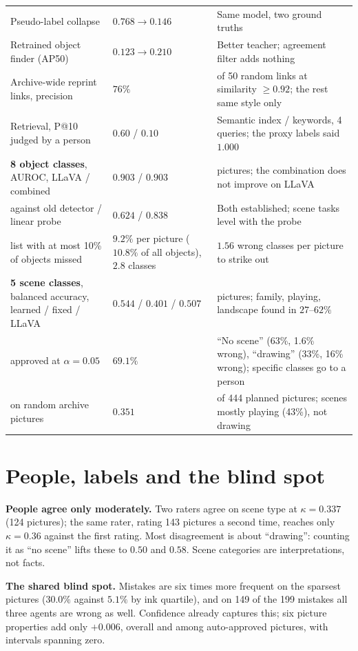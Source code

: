 \documentclass[10pt,a4paper]{article}
\begin{document}
\begin{center}
\begin{tabular}{>{\raggedright\arraybackslash}p{5.7cm} >{\raggedright\arraybackslash}p{3.4cm} >{\raggedright\arraybackslash}p{7.6cm}}
Pseudo-label collapse & $0.768\!\to\!0.146$ & Same model, two ground truths \\
Retrained object finder (AP50) & $0.123\!\to\!0.210$ & Better teacher; agreement filter adds nothing \\
Archive-wide reprint links, precision & $76\%$ & 38 of 50 random links at similarity $\geq 0.92$; the rest same style only \\
Retrieval, P@10 judged by a person & $0.60$ / $0.10$ & Semantic index / keywords, 4 queries; the proxy labels said $1.000$ \\
\textbf{8 object classes}, AUROC, LLaVA / combined & $0.903$ / $0.903$ & 300 pictures; the combination does not improve on LLaVA \\
\quad against old detector / linear probe & $0.624$ / $0.838$ & Both established; scene tasks level with the probe \\
\quad list with at most 10\% of objects missed & $9.2\%$ per picture ($10.8\%$ of all objects), $2.8$ classes & $1.56$ wrong classes per picture to strike out \\
\textbf{5 scene classes}, balanced accuracy, learned / fixed / LLaVA & $0.544$ / $0.401$ / $0.507$ & 992 pictures; family, playing, landscape found in $27$--$62\%$ \\
\quad approved at $\alpha=0.05$ & $69.1\%$ & ``No scene'' (63\%, 1.6\% wrong), ``drawing'' (33\%, 16\% wrong); specific classes go to a person \\
\quad on random archive pictures & $0.351$ & 179 of 444 planned pictures; scenes mostly playing (43\%), not drawing \\
\bottomrule
\end{tabular}
\end{center}

\section{People, labels and the blind spot}
\textbf{People agree only moderately.} Two raters agree on scene type at $\kappa=0.337$ (124 pictures); the same rater, rating 143 pictures a second time, reaches only $\kappa=0.36$ against the first rating. Most disagreement is about ``drawing'': counting it as ``no scene'' lifts these to $0.50$ and $0.58$. Scene categories are interpretations, not facts.

\textbf{The shared blind spot.} Mistakes are six times more frequent on the sparsest pictures ($30.0\%$ against $5.1\%$ by ink quartile), and on 149 of the 199 mistakes all three agents are wrong as well. Confidence already captures this; six picture properties add only $+0.006$, overall and among auto-approved pictures, with intervals spanning zero.
\end{document}
